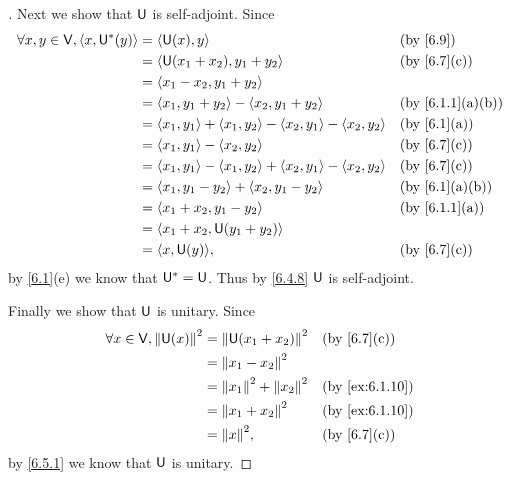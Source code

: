 \begin{proof}[]
  Next we show that \(\mathsf{U}\) is self-adjoint.
  Since
  \begin{align*}
    \forall x, y \in \V, \inn{x, \U^*(y)} & = \inn{\U(x), y}                                                    &  & \by{6.9}        \\
                                          & = \inn{\U(x_1 + x_2), y_1 + y_2}                                    &  & \by{6.7}[c]     \\
                                          & = \inn{x_1 - x_2, y_1 + y_2}                                                             \\
                                          & = \inn{x_1, y_1 + y_2} - \inn{x_2, y_1 + y_2}                       &  & \by{6.1.1}[a,b] \\
                                          & = \inn{x_1, y_1} + \inn{x_1, y_2} - \inn{x_2, y_1} - \inn{x_2, y_2} &  & \by{6.1}[a]     \\
                                          & = \inn{x_1, y_1} - \inn{x_2, y_2}                                   &  & \by{6.7}[c]     \\
                                          & = \inn{x_1, y_1} - \inn{x_1, y_2} + \inn{x_2, y_1} - \inn{x_2, y_2} &  & \by{6.7}[c]     \\
                                          & = \inn{x_1, y_1 - y_2} + \inn{x_2, y_1 - y_2}                       &  & \by{6.1}[a,b]   \\
                                          & = \inn{x_1 + x_2, y_1 - y_2}                                        &  & \by{6.1.1}[a]   \\
                                          & = \inn{x_1 + x_2, \U(y_1 + y_2)}                                                         \\
                                          & = \inn{x, \U(y)},                                                   &  & \by{6.7}[c]
  \end{align*}
  by \cref{6.1}(e) we know that \(\mathsf{U}^* = \mathsf{U}\).
  Thus by \cref{6.4.8} \(\mathsf{U}\) is self-adjoint.

  Finally we show that \(\mathsf{U}\) is unitary.
  Since
  \begin{align*}
    \forall x \in \V, \norm{\U(x)}^2 & = \norm{\U(x_1 + x_2)}^2      &  & \by{6.7}[c]    \\
                                     & = \norm{x_1 - x_2}^2                              \\
                                     & = \norm{x_1}^2 + \norm{x_2}^2 &  & \by{ex:6.1.10} \\
                                     & = \norm{x_1 + x_2}^2          &  & \by{ex:6.1.10} \\
                                     & = \norm{x}^2,                 &  & \by{6.7}[c]
  \end{align*}
  by \cref{6.5.1} we know that \(\mathsf{U}\) is unitary.
\end{proof}

